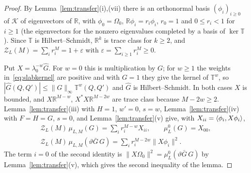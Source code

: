 \begin{proof}
By Lemma~\ref{lem:transfer}(i),(vii) there is an orthonormal basis
$(\phi_i)_{i\ge0}$ of $\mathcal K$ of eigenvectors of $\mathbb R$, with
$\phi_0=\Omega_0$, $\mathbb R\phi_i=r_i\phi_i$, $r_0=1$ and $0\le r_i<1$
for $i\ge1$ (the eigenvectors for the nonzero eigenvalues completed by a
basis of $\ker\mathbb T$). Since $\mathbb T$ is Hilbert--Schmidt, $\mathbb R^k$ is
trace class for $k\ge2$, and $\mathcal Z_L(M)=\sum_ir_i^M=1+\varepsilon$ with
$\varepsilon=\sum_{i\ge1}r_i^M\ge0$.

Put $X=\lambda_0^{-w}\hat G$. For $w=0$ this is multiplication by $G$; for
$w\ge1$ the weights in~\eqref{eq:slabkernel} are positive and with $G=1$
they give the kernel of $\mathbb T^w$, so $|\hat G(Q,Q')|\le\|G\|_\infty
\mathbb T^w(Q,Q')$ and $\hat G$ is Hilbert--Schmidt. In both cases $X$ is
bounded, and $X\mathbb R^{M-w}$, $X^*X\mathbb R^{M-2w}$ are trace class because
$M-2w\ge2$. Lemma~\ref{lem:transfer}(iii) with $H=1$, $w'=0$, $s=w$,
Lemma~\ref{lem:transfer}(iv) with $F=H=G$, $s=0$, and
Lemma~\ref{lem:transfer}(v) give, with $X_{ii}=\langle \phi_i,X\phi_i\rangle$,
\begin{equation}\label{eq:thermaltraces}
\begin{gathered}
\mathcal Z_L(M)\,\mu_{L,M}(G)=\sum_ir_i^{M-w}X_{ii},\qquad
\mu^0_L(G)=X_{00},\\
\mathcal Z_L(M)\,\mu_{L,M}(\vartheta\bar G\,G)=\sum_ir_i^{M-2w}\|X\phi_i\|^2.
\end{gathered}
\end{equation}
The term $i=0$ of the second identity is $\|X\Omega_0\|^2=\mu^0_L(\vartheta
\bar G\,G)$ by Lemma~\ref{lem:transfer}(v), which gives the second
inequality of the lemma.


\end{proof}
